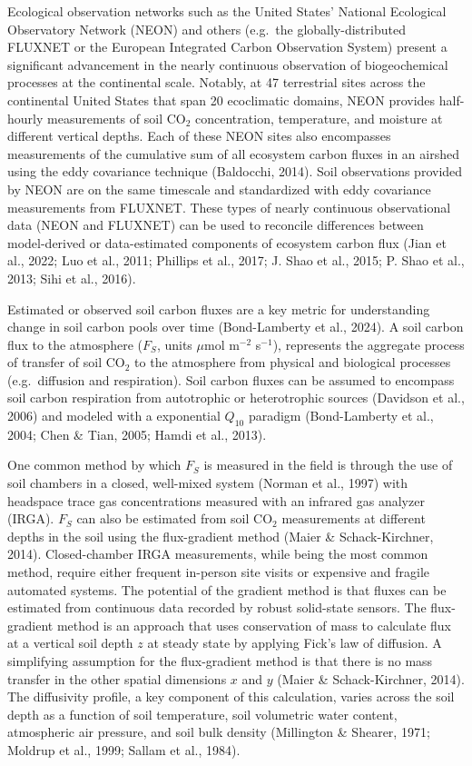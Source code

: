 \documentclass[
  letterpaper,
  DIV=11,
  numbers=noendperiod]{scrartcl}
\begin{document}
Ecological observation networks such as the United States' National
Ecological Observatory Network (NEON) and others (e.g.~the
globally-distributed FLUXNET or the European Integrated Carbon
Observation System) present a significant advancement in the nearly
continuous observation of biogeochemical processes at the continental
scale. Notably, at 47 terrestrial sites across the continental United
States that span 20 ecoclimatic domains, NEON provides half-hourly
measurements of soil CO\(_{2}\) concentration, temperature, and moisture
at different vertical depths. Each of these NEON sites also encompasses
measurements of the cumulative sum of all ecosystem carbon fluxes in an
airshed using the eddy covariance technique (Baldocchi, 2014). Soil
observations provided by NEON are on the same timescale and standardized
with eddy covariance measurements from FLUXNET. These types of nearly
continuous observational data (NEON and FLUXNET) can be used to
reconcile differences between model-derived or data-estimated components
of ecosystem carbon flux (Jian et al., 2022; Luo et al., 2011; Phillips
et al., 2017; J. Shao et al., 2015; P. Shao et al., 2013; Sihi et al.,
2016).

Estimated or observed soil carbon fluxes are a key metric for
understanding change in soil carbon pools over time (Bond-Lamberty et
al., 2024). A soil carbon flux to the atmosphere (\(F_{S}\), units
\(\mu\)mol m\(^{-2}\) s\(^{-1}\)), represents the aggregate process of
transfer of soil CO\(_{2}\) to the atmosphere from physical and
biological processes (e.g.~diffusion and respiration). Soil carbon
fluxes can be assumed to encompass soil carbon respiration from
autotrophic or heterotrophic sources (Davidson et al., 2006) and modeled
with a exponential \(Q_{10}\) paradigm (Bond-Lamberty et al., 2004; Chen
\& Tian, 2005; Hamdi et al., 2013).

One common method by which \(F_{S}\) is measured in the field is through
the use of soil chambers in a closed, well-mixed system (Norman et al.,
1997) with headspace trace gas concentrations measured with an infrared
gas analyzer (IRGA). \(F_{S}\) can also be estimated from soil
CO\(_{2}\) measurements at different depths in the soil using the
flux-gradient method (Maier \& Schack-Kirchner, 2014). Closed-chamber
IRGA measurements, while being the most common method, require either
frequent in-person site visits or expensive and fragile automated
systems. The potential of the gradient method is that fluxes can be
estimated from continuous data recorded by robust solid-state sensors.
The flux-gradient method is an approach that uses conservation of mass
to calculate flux at a vertical soil depth \(z\) at steady state by
applying Fick's law of diffusion. A simplifying assumption for the
flux-gradient method is that there is no mass transfer in the other
spatial dimensions \(x\) and \(y\) (Maier \& Schack-Kirchner, 2014). The
diffusivity profile, a key component of this calculation, varies across
the soil depth as a function of soil temperature, soil volumetric water
content, atmospheric air pressure, and soil bulk density (Millington \&
Shearer, 1971; Moldrup et al., 1999; Sallam et al., 1984).
\end{document}
